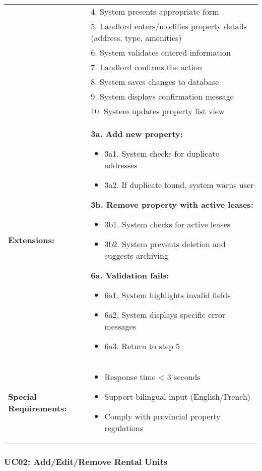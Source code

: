 \documentclass[12pt]{article}
\begin{document}
\begin{tabular}{|p{3cm}|p{11cm}|}
& 4. System presents appropriate form \\
& 5. Landlord enters/modifies property details (address, type, amenities) \\
& 6. System validates entered information \\
& 7. Landlord confirms the action \\
& 8. System saves changes to database \\
& 9. System displays confirmation message \\
& 10. System updates property list view \\
\hline
\textbf{Extensions:} & 
\textbf{3a. Add new property:}
\begin{itemize}
    \item 3a1. System checks for duplicate addresses
    \item 3a2. If duplicate found, system warns user
\end{itemize}
\textbf{3b. Remove property with active leases:}
\begin{itemize}
    \item 3b1. System checks for active leases
    \item 3b2. System prevents deletion and suggests archiving
\end{itemize}
\textbf{6a. Validation fails:}
\begin{itemize}
    \item 6a1. System highlights invalid fields
    \item 6a2. System displays specific error messages
    \item 6a3. Return to step 5
\end{itemize} \\
\hline
\textbf{Special Requirements:} & 
\begin{itemize}
    \item Response time < 3 seconds
    \item Support bilingual input (English/French)
    \item Comply with provincial property regulations
\end{itemize} \\
\hline
\end{tabular}

\subsubsection{UC02: Add/Edit/Remove Rental Units}
\end{document}
